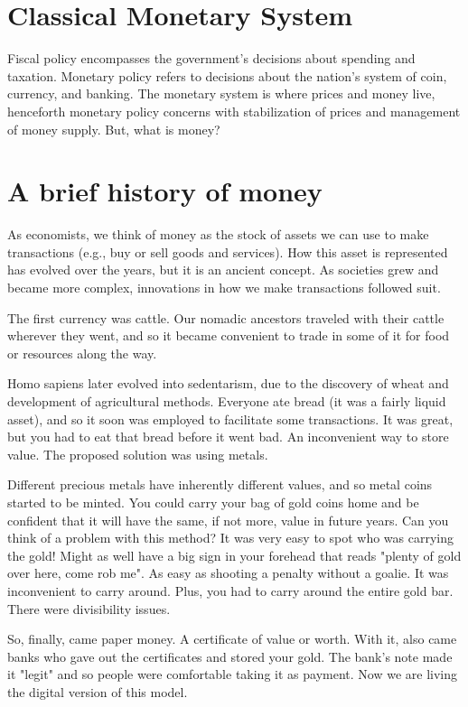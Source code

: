 \documentclass[10pt]{article}
\begin{document}
\section*{Classical Monetary System}
Fiscal policy encompasses the government's decisions about spending and taxation. Monetary policy refers to decisions about the nation's system of coin, currency, and banking. The monetary system is where prices and money live, henceforth monetary policy concerns with stabilization of prices and management of money supply. But, what is money?

\section*{A brief history of money}
As economists, we think of money as the stock of assets we can use to make transactions (e.g., buy or sell goods and services). How this asset is represented has evolved over the years, but it is an ancient concept. As societies grew and became more complex, innovations in how we make transactions followed suit.

The first currency was cattle. Our nomadic ancestors traveled with their cattle wherever they went, and so it became convenient to trade in some of it for food or resources along the way.

Homo sapiens later evolved into sedentarism, due to the discovery of wheat and development of agricultural methods. Everyone ate bread (it was a fairly liquid asset), and so it soon was employed to facilitate some transactions. It was great, but you had to eat that bread before it went bad. An inconvenient way to store value. The proposed solution was using metals.

Different precious metals have inherently different values, and so metal coins started to be minted. You could carry your bag of gold coins home and be confident that it will have the same, if not more, value in future years. Can you think of a problem with this method? It was very easy to spot who was carrying the gold! Might as well have a big sign in your forehead that reads "plenty of gold over here, come rob me". As easy as shooting a penalty without a goalie. It was inconvenient to carry around. Plus, you had to carry around the entire gold bar. There were divisibility issues.

So, finally, came paper money. A certificate of value or worth. With it, also came banks who gave out the certificates and stored your gold. The bank's note made it "legit" and so people were comfortable taking it as payment. Now we are living the digital version of this model.
\end{document}
